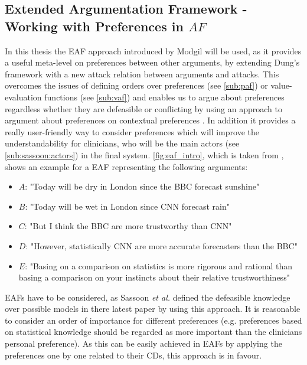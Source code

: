 \subsection{Extended Argumentation Framework - Working with Preferences in $AF$}
\label{sub:eaf}



In this thesis the \gls{EAF} approach introduced by Modgil \cite{Modgil2009} will be used, as it provides a useful meta-level on preferences between other arguments, by extending Dung's framework with a new attack relation between arguments and attacks. This overcomes the issues of defining orders over preferences (see \autoref{sub:paf}) or value-evaluation functions (see \autoref{sub:vaf}) and enables us to argue about preferences regardless whether they are defeasible or conflicting by using an approach to argument about preferences on contextual preferences \cite{amgoud2000}. In addition it provides a really user-friendly way to consider preferences which will improve the understandability for clinicians, who will be the main actors (see \autoref{sub:sassoon:actors}) in the final system.
\autoref{fig:eaf_intro}, which is taken from \cite{Modgil2009}, shows an example for a \gls{EAF} representing the following arguments:

\begin{itemize}
	\item $A$: "Today will be dry in London since the BBC forecast sunshine"
	\item $B$: "Today will be wet in London since CNN forecast rain"
	\item $C$: "But I think the BBC are more trustworthy than CNN"
	\item $D$: "However, statistically CNN are more accurate forecasters than the BBC"
	\item $E$: "Basing on a comparison on statistics is more rigorous and rational than basing a comparison on your instincts about their relative trustworthiness"
\end{itemize}

\bigskip

\Glspl{EAF} have to be considered, as Sassoon \textit{et al.} defined the defeasible knowledge over possible models in there latest paper \cite{sassoon2016CD} by using this approach. It is reasonable to consider an order of importance for different preferences (e.g. preferences based on statistical knowledge should be regarded as more important than the clinicians personal preference). As this can be easily achieved in \glspl{EAF} by applying the preferences one by one related to their \glspl{CD}, this approach is in favour.

